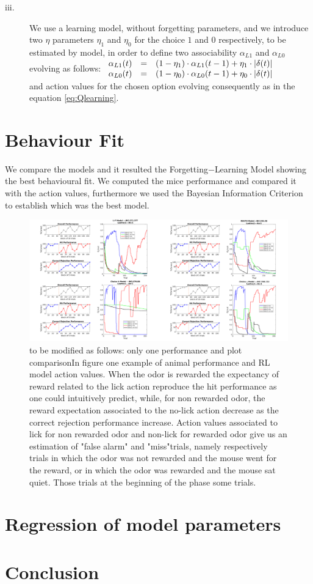 \begin{description}
    \item[iii.] We use a learning model, without forgetting parameters, and we introduce two $\eta$ parameters $\eta_1$ and $\eta_0$ for the choice $1$ and $0$ respectively, to be estimated by model, in order to define two associability $\alpha_{L1}$ and $\alpha_{L0}$ evolving as follows:
    $\begin{array}{lcl}
    \alpha_{L1}(t) & = & (1-\eta_1)\cdot\alpha_{L1}(t-1)+\eta_1\cdot\left\lvert\delta(t)\right\rvert \\
    \alpha_{L0}(t) & = & (1-\eta_0)\cdot\alpha_{L0}(t-1)+\eta_0\cdot\left\lvert\delta(t)\right\rvert \\
    \end{array}$\\
    and action values for the chosen option evolving consequently as in the equation \ref{eq:Qlearning}.
\end{description}
\section{Behaviour Fit}
We compare the models and it resulted the Forgetting$-$Learning Model showing the best behavioural fit. We computed the mice performance and compared it with the action values, furthermore we used the Bayesian Information Criterion to establish which was the best model.\\

\begin{figure}[ht!]
    \includegraphics[scale=0.3]{figures/ResumeRLPerf.png}
    \caption{{\color{red} to be modified as follows: only one performance and plot comparison}In figure one example of animal performance and RL model action values. When the odor is rewarded the expectancy of reward related to the lick action reproduce the hit performance as one could intuitively predict, while, for non rewarded odor, the reward expectation associated to the no-lick action decrease as the correct rejection performance increase. Action values associated to lick for non rewarded odor and non-lick for rewarded odor give us an estimation of "false alarm" and "miss"trials, namely respectively trials in which the odor was not rewarded and the mouse went for the reward, or in which the odor was rewarded and the mouse sat quiet. Those trials at the beginning of the phase some trials.}
    \label{fig:PerfRL}
\end{figure}
    

\section{Regression of model parameters}
\section{Conclusion}